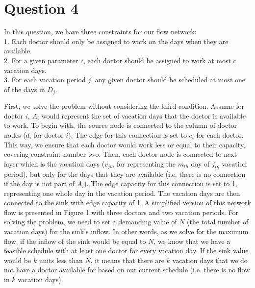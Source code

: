 \section{Question 4}

In this question, we have three constraints for our flow network:
\\ 1. Each doctor should only be assigned to work on the days when they are available.
\\ 2. For a given parameter $c$, each doctor should be assigned to work at most $c$ vacation days.
\\ 3. For each vacation period $j$, any given doctor should be scheduled at most one of the days in $D_j$. 

First, we solve the problem without considering the third condition. Assume for doctor $i$, $A_i$ would represent
the set of vacation days that the doctor is available to work. To begin with, the source node is connected to the column
of doctor nodes ($d_i$ for doctor $i$). The edge for this connection is set to $c_i$ for each doctor. This way, we ensure that each doctor
would work less or equal to their capacity, covering constraint number two. Then, each doctor node is connected to next layer which is the vacation
days ($v_{jm}$ for representing the $m_{th}$ day of $j_{th}$ vacation period), but only for the days that they are available (i.e. there is no connection if
the day is not part of $A_i$). The edge capacity for this connection is set to 1, representing one whole day in the vacation period.
The vacation days are then connected to the sink with edge capacity of 1. A simplified version of this network flow is presented in Figure 1 with three doctors 
and two vacation periods. For solving the problem, we need to set a demanding value of $N$ (the total number of vacation days) for the sink's inflow. In other words, as we solve for the
maximum flow, if the inflow of the sink would be equal to $N$, we know that we have a feasible schedule with at least one doctor for every vacation day. If the sink value would be $k$ units less than $N$, it means
that there are $k$ vacation days that we do not have a doctor available for based on our current schedule (i.e. there is no flow in $k$ vacation days). 

